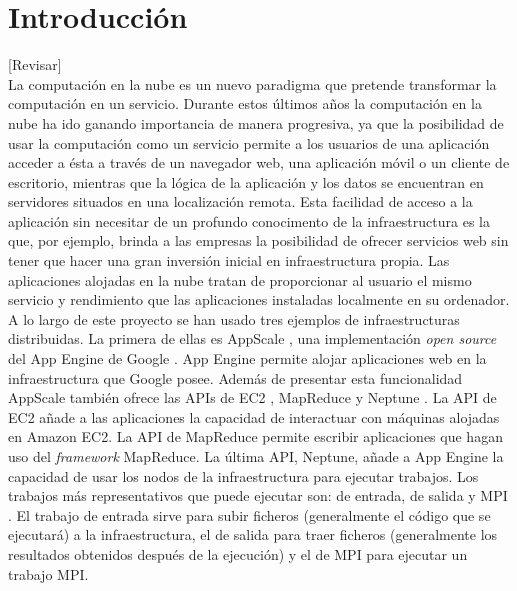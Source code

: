 \chapter{Introducción}
\label{cap:introduccion}

[Revisar]\\

La computación en la nube es un nuevo paradigma que pretende transformar la computación en un servicio. Durante estos últimos años la computación en la nube ha ido ganando importancia de manera progresiva, ya que la posibilidad de usar la computación como un servicio permite a los usuarios de una aplicación acceder a ésta a través de un navegador web, una aplicación móvil o un cliente de escritorio, mientras que la lógica de la aplicación y los datos se encuentran en servidores situados en una localización remota. Esta facilidad de acceso a la aplicación sin necesitar de un profundo conocimento de la infraestructura es la que, por ejemplo, brinda a las empresas la posibilidad de ofrecer servicios web sin tener que hacer una gran inversión inicial en infraestructura propia. Las aplicaciones alojadas en la nube tratan de proporcionar al usuario el mismo servicio y rendimiento que las aplicaciones instaladas localmente en su ordenador.\\

A lo largo de este proyecto se han usado tres ejemplos de infraestructuras distribuidas. La primera de ellas es AppScale \cite{appscale}, una implementación \emph{open source} del App Engine de Google \cite{appengine}. App Engine permite alojar aplicaciones web en la infraestructura que Google posee. Además de presentar esta funcionalidad AppScale también ofrece las APIs \footnotemark de EC2 \cite{appscale-ec2}, MapReduce \cite{appscale-mapreduce} y Neptune \cite{appscale-neptune}. La API de EC2 añade a las aplicaciones la capacidad de interactuar con máquinas alojadas en Amazon EC2. La API de MapReduce permite escribir aplicaciones que hagan uso del \emph{framework} MapReduce. La última API, Neptune, añade a App Engine la capacidad de usar los nodos de la infraestructura para ejecutar trabajos. Los trabajos más representativos que puede ejecutar son: de entrada, de salida y MPI \footnotemark. El trabajo de entrada sirve para subir ficheros (generalmente el código que se ejecutará) a la infraestructura, el de salida para traer ficheros (generalmente los resultados obtenidos después de la ejecución) y el de MPI para ejecutar un trabajo MPI.


